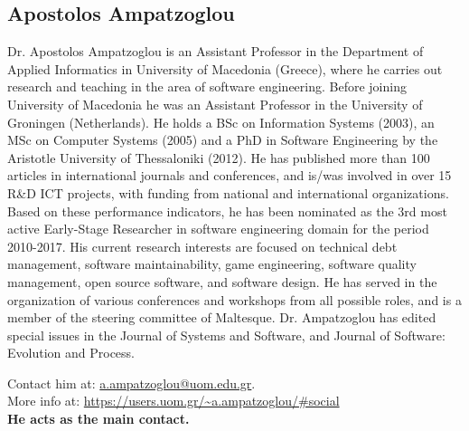 \subsection{Apostolos Ampatzoglou}
Dr. Apostolos Ampatzoglou is an Assistant Professor in the Department of Applied Informatics in University of Macedonia (Greece), where he carries out research and teaching in the area of software engineering. Before joining University of Macedonia he was an Assistant Professor in the University of Groningen (Netherlands). He holds a BSc on Information Systems (2003), an MSc on Computer Systems (2005) and a PhD in Software Engineering by the Aristotle University of Thessaloniki (2012). He has published more than 100 articles in international journals and conferences, and is/was involved in over 15 R\&D ICT projects, with funding from national and international organizations. Based on these performance indicators, he has been nominated as the 3rd most active Early-Stage Researcher in software engineering domain for the period 2010-2017. His current research interests are focused on technical debt management, software maintainability, game engineering, software quality management, open source software, and software design. He has served in the organization of various conferences and workshops from all possible roles, and is a member of the steering committee of Maltesque. Dr. Ampatzoglou has edited special issues in the Journal of Systems and Software, and Journal of Software: Evolution and Process.

\medskip
\noindent Contact him at: \href{mailto:a.ampatzoglou@uom.edu.gr}{a.ampatzoglou@uom.edu.gr}.\\
More info at: \url{https://users.uom.gr/~a.ampatzoglou/#social}\\
\textbf{He acts as the main contact.}
